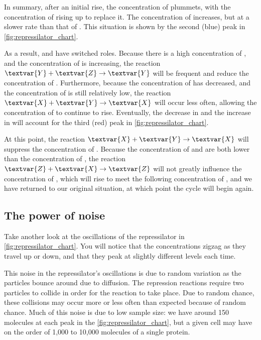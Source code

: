 In summary, after an initial rise, the concentration of  plummets, with the concentration of  rising up to replace it. The concentration of  increases, but at a slower rate than that of . This situation is shown by the second (blue) peak in \autoref{fig:repressilator_chart}.

As a result,  and  have switched roles. Because there is a high concentration of , and the concentration of  is increasing, the reaction $\textvar{Y} + \textvar{Z} \rightarrow \textvar{Y}$ will be frequent and reduce the concentration of . Furthermore, because the concentration of  has decreased, and the concentration of  is still relatively low, the reaction $\textvar{X} + \textvar{Y} \rightarrow \textvar{X}$ will occur less often, allowing the concentration of  to continue to rise. Eventually, the decrease in  and the increase in  will account for the third (red) peak in \autoref{fig:repressilator_chart}.

At this point, the reaction $\textvar{X} + \textvar{Y} \rightarrow \textvar{X}$ will suppress the concentration of . Because the concentration of  and  are both lower than the concentration of , the reaction $\textvar{Z} + \textvar{X} \rightarrow \textvar{Z}$ will not greatly influence the concentration of , which will rise to meet the following concentration of , and we have returned to our original situation, at which point the cycle will begin again.

\FloatBarrier
{}
\subsection{The power of noise}

Take another look at the oscillations of the repressilator in \autoref{fig:repressilator_chart}. You will notice that the concentrations zigzag as they travel up or down, and that they peak at slightly different levels each time.

This noise in the repressilator's oscillations is due to random variation as the particles bounce around due to diffusion. The repression reactions require two particles to collide in order for the reaction to take place. Due to random chance, these collisions may occur more or less often than expected because of random chance. Much of this noise is due to low sample size: we have around 150 molecules at each peak in the \autoref{fig:repressilator_chart}, but a given cell may have on the order of 1,000 to 10,000 molecules of a single protein.

